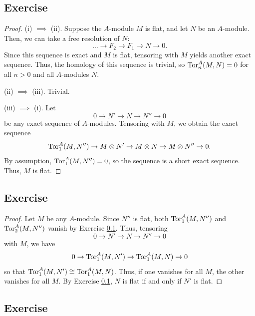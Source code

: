 \subsection{Exercise}\label{2.24} %

\begin{proof}
(i) $\implies$ (ii). Suppose the $A$-module $M$ is flat, and let $N$ be an $A$-module. Then, we can take a free resolution of $N$:
$$\dots \to F_2 \to F_1 \to N \to 0.$$
Since this sequence is exact and $M$ is flat, tensoring with $M$ yields another exact sequence. Thus, the homology of this sequence is trivial,
so $\operatorname{Tor}_n^A(M,N) = 0$ for all $n > 0$ and all $A$-modules $N$.

(ii) $\implies$ (iii). Trivial.

(iii) $\implies$ (i). Let
$$0 \to N' \to N \to N'' \to 0$$
be any exact sequence of $A$-modules. Tensoring with $M$, we obtain the exact sequence
$$\operatorname{Tor}_1^A(M, N'') \to M \otimes N' \to M \otimes N \to M \otimes N'' \to 0.$$
By assumption, $\operatorname{Tor}_1^A(M, N'') = 0$, so the sequence is a short exact sequence. Thus, $M$ is flat.
\end{proof}

\subsection{Exercise}\label{2.25} %

\begin{proof}
Let $M$ be any $A$-module. Since $N''$ is flat, both $\operatorname{Tor}_1^A(M,N'')$ and $\operatorname{Tor}_2^A(M,N'')$ vanish by Exercise \ref{2.24}. Thus, tensoring
$$0 \to N' \to N \to N'' \to 0$$
with $M$, we have
$$0 \to \operatorname{Tor}_1^A(M,N') \to \operatorname{Tor}_1^A(M,N) \to 0$$
so that $\operatorname{Tor}_1^A(M,N') \cong \operatorname{Tor}_1^A(M,N)$. Thus, if one vanishes for all $M$, the other vanishes for all $M$. By Exercise \ref{2.24},
$N$ is flat if and only if $N'$ is flat.
\end{proof}

\subsection{Exercise}\label{2.26} %


